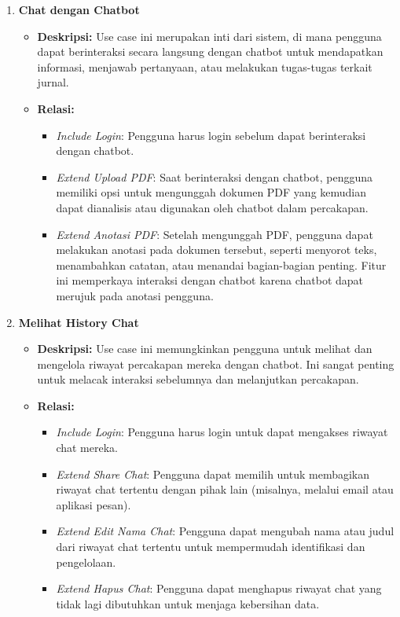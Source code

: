 \begin{enumerate}
    \item \textbf{Chat dengan Chatbot}
    \begin{itemize}
        \item \textbf{Deskripsi:} Use case ini merupakan inti dari sistem, di mana pengguna dapat berinteraksi secara langsung dengan chatbot untuk mendapatkan informasi, menjawab pertanyaan, atau melakukan tugas-tugas terkait jurnal.
        \item \textbf{Relasi:}
        \begin{itemize}
            \item \textit{Include Login}: Pengguna harus login sebelum dapat berinteraksi dengan chatbot.
            \item \textit{Extend Upload PDF}: Saat berinteraksi dengan chatbot, pengguna memiliki opsi untuk mengunggah dokumen PDF yang kemudian dapat dianalisis atau digunakan oleh chatbot dalam percakapan.
            \item \textit{Extend Anotasi PDF}: Setelah mengunggah PDF, pengguna dapat melakukan anotasi pada dokumen tersebut, seperti menyorot teks, menambahkan catatan, atau menandai bagian-bagian penting. Fitur ini memperkaya interaksi dengan chatbot karena chatbot dapat merujuk pada anotasi pengguna.
        \end{itemize}
    \end{itemize}

    \item \textbf{Melihat History Chat}
    \begin{itemize}
        \item \textbf{Deskripsi:} Use case ini memungkinkan pengguna untuk melihat dan mengelola riwayat percakapan mereka dengan chatbot. Ini sangat penting untuk melacak interaksi sebelumnya dan melanjutkan percakapan.
        \item \textbf{Relasi:}
        \begin{itemize}
            \item \textit{Include Login}: Pengguna harus login untuk dapat mengakses riwayat chat mereka.
            \item \textit{Extend Share Chat}: Pengguna dapat memilih untuk membagikan riwayat chat tertentu dengan pihak lain (misalnya, melalui email atau aplikasi pesan).
            \item \textit{Extend Edit Nama Chat}: Pengguna dapat mengubah nama atau judul dari riwayat chat tertentu untuk mempermudah identifikasi dan pengelolaan.
            \item \textit{Extend Hapus Chat}: Pengguna dapat menghapus riwayat chat yang tidak lagi dibutuhkan untuk menjaga kebersihan data.
        \end{itemize}
    \end{itemize}
\end{enumerate}

